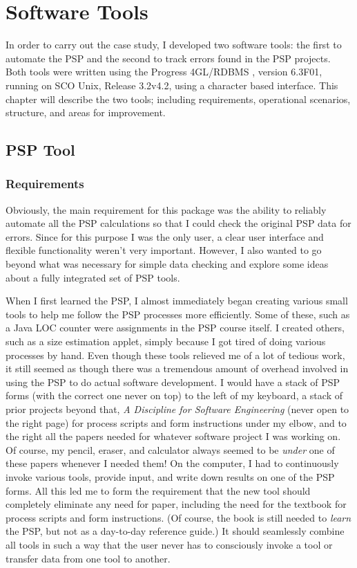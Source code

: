 
\chapter{Software Tools}

In order to carry out the case study, I developed two software tools: the
first to automate the PSP and the second to track errors found in the PSP
projects.  Both tools were written using the Progress 4GL/RDBMS
\cite{Progress98}, version 6.3F01, running on SCO Unix, Release 3.2v4.2,
using a character based interface.  This chapter will describe the two
tools; including requirements, operational scenarios, structure, and areas
for improvement.

\section{PSP Tool}

\subsection{Requirements}

Obviously, the main requirement for this package was the ability to
reliably automate all the PSP calculations so that I could check the
original PSP data for errors.  Since for this purpose I was the only user,
a clear user interface and flexible functionality weren't very important.
However, I also wanted to go beyond what was necessary for simple data
checking and explore some ideas about a fully integrated set of PSP tools.

When I first learned the PSP, I almost immediately began creating various
small tools to help me follow the PSP processes more efficiently.  Some of
these, such as a Java LOC counter were assignments in the PSP course
itself.  I created others, such as a size estimation applet, simply because
I got tired of doing various processes by hand.  Even though these tools
relieved me of a lot of tedious work, it still seemed as though there was a
tremendous amount of overhead involved in using the PSP to do actual
software development.  I would have a stack of PSP forms (with the correct
one never on top) to the left of my keyboard, a stack of prior projects
beyond that, {\it A Discipline for Software Engineering} (never open to the
right page) for process scripts and form instructions under my elbow, and
to the right all the papers needed for whatever software project I was
working on.  Of course, my pencil, eraser, and calculator always seemed to
be {\it under} one of these papers whenever I needed them! On the computer,
I had to continuously invoke various tools, provide input, and write down
results on one of the PSP forms.  All this led me to form the requirement
that the new tool should completely eliminate any need for paper, including
the need for the textbook for process scripts and form instructions.  (Of
course, the book is still needed to {\it learn} the PSP, but not as a
day-to-day reference guide.)  It should seamlessly combine all tools in
such a way that the user never has to consciously invoke a tool or transfer
data from one tool to another.

